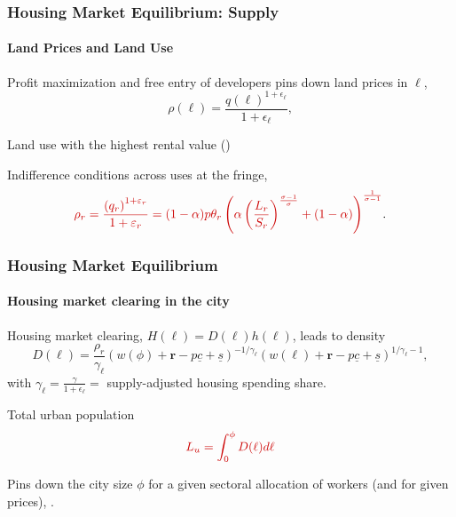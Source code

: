 \documentclass[aspectratio=169]{beamer}
\begin{document}
\begin{v75mins}
\begin{frame}
\frametitle{Housing Market Equilibrium: Supply}
\framesubtitle{Land Prices and Land Use}
\bi
\item Profit maximization and free entry of developers pins down land prices in $\ell$,
\begin{equation*}
\rho(\ell)=\frac{q(\ell)^{1+\epsilon_{\ell}}}{ 1+\epsilon_{\ell}},
\end{equation*}
\item Land use with the highest rental value ()
\item Indifference conditions across uses at the fringe,
\begin{equation*}
 \re{\rho_r=\frac{\left( q_r \right)^{1+\varepsilon_r}}{1+\varepsilon_r} = (1-\alpha)p\theta_r\left(\alpha \left(\frac{L_r}{S_r}\right)^{\frac{\sigma-1}{\sigma}} +(1-\alpha) \right)^{\frac{1}{\sigma-1}}}.
\end{equation*}
\ei
\end{frame}
\end{v75mins}


\begin{frame}
\frametitle{Housing Market Equilibrium}
\framesubtitle{Housing market clearing in the city}
\bi
\item Housing market clearing, $H(\ell)=D(\ell)h(\ell)$, leads to density
\begin{equation*}
D(\ell)= \frac{\rho_r}{\gamma_{\ell}}(w(\phi)+\mathbf{r}-p\underline{c}+\underline{s}) ^{-1/\gamma_{\ell} } (w(\ell)+\mathbf{r}-p\underline{c}+\underline{s})^{1/\gamma_{\ell} -1},
\end{equation*}
with $\gamma_{\ell}=\frac{\gamma}{1+\epsilon_{\ell}}=$ supply-adjusted housing spending share.
\item Total urban population
\begin{equation}
\re{L_u=\int_0^{\phi}D(\ell)d\ell}  \label{eq:citysize}
\end{equation}
\item Pins down the city size $\phi$ for a given sectoral allocation of workers (and for given prices), .
\ei
\end{frame}
\end{document}
